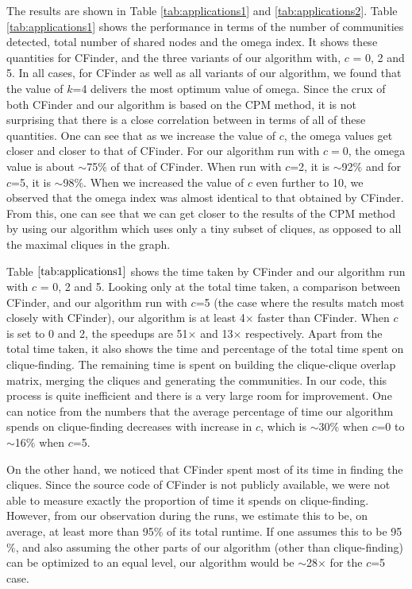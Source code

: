 The results are shown in Table \ref{tab:applications1} and \ref{tab:applications2}. Table \ref{tab:applications1} shows the performance in terms of the number of communities detected, total number of shared nodes and the omega index. It shows these quantities for CFinder, and the three variants of our algorithm with, $c$ = 0, 2 and 5. In all cases, for CFinder as well as all variants of our algorithm, we found that the value of $k$=4 delivers the most optimum value of omega. Since the crux of both CFinder and our algorithm is based on the CPM method, it is not surprising that there is a close correlation between in terms of all of these quantities. One can see that as we increase the value of $c$, the omega values get closer and closer to that of CFinder. For our algorithm run with $c=0$, the omega value is about $\sim$75$\%$ of that of CFinder. When run with $c$=2, it is $\sim$92$\%$ and for $c$=5, it is $\sim$98$\%$. When we increased the value of $c$ even further to 10, we observed that the omega index was almost identical to that obtained by CFinder. From this, one can see that we can get closer to the results of the CPM method by using our algorithm which uses only a tiny subset of cliques, as opposed to all the maximal cliques in the graph.

Table $\ref{tab:applications1}$ shows the time taken by CFinder and our algorithm run with $c$ = 0, 2 and 5. Looking only at the total time taken, a comparison between CFinder, and our algorithm run with $c$=5 (the case where the results match most closely with CFinder), our algorithm is at least 4$\times$ faster than CFinder. When $c$ is set to 0 and 2, the speedups are 51$\times$ and 13$\times$ respectively. Apart from the total time taken, it also shows the time and percentage of the total time spent on clique-finding. The remaining time is spent on building the clique-clique overlap matrix, merging the cliques and generating the communities. In our code, this process is quite inefficient and there is a very large room for improvement. One can notice from the numbers that the average percentage of time our algorithm spends on clique-finding decreases with increase in $c$, which is $\sim$30$\%$ when $c$=0 to $\sim$16$\%$ when $c$=5.




On the other hand, we noticed that CFinder spent most of its time in finding the cliques. Since the source code of CFinder is not publicly available, we were not able to measure exactly the proportion of time it spends on clique-finding. However, from our observation during the runs, we estimate this to be, on average, at least more than 95$\%$ of its total runtime. If one assumes this to be 95$\%$, and also assuming the other parts of our algorithm (other than clique-finding) can be optimized to an equal level, our algorithm would be $\sim$28$\times$ for the $c$=5 case. 


